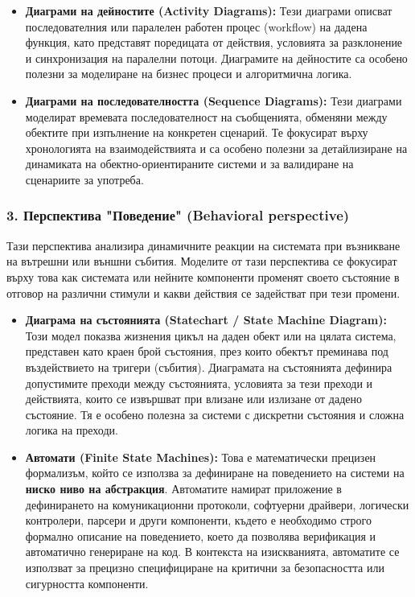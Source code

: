 \documentclass{scrartcl}
\begin{document}
\begin{FlushLeft}
\begin{itemize}
    \item \textbf{Диаграми на дейностите (Activity Diagrams):} Тези диаграми описват последователния или паралелен работен процес (workflow) на дадена функция, като представят поредицата от действия, условията за разклонение и синхронизация на паралелни потоци. Диаграмите на дейностите са особено полезни за моделиране на бизнес процеси и алгоритмична логика.
    
    \item \textbf{Диаграми на последователността (Sequence Diagrams):} Тези диаграми моделират времевата последователност на съобщенията, обменяни между обектите при изпълнение на конкретен сценарий. Те фокусират върху хронологията на взаимодействията и са особено полезни за детайлизиране на динамиката на обектно-ориентираните системи и за валидиране на сценариите за употреба.
\end{itemize}

\subsubsection{3. Перспектива "Поведение" (Behavioral perspective)}

Тази перспектива анализира динамичните реакции на системата при възникване на вътрешни или външни събития. Моделите от тази перспектива се фокусират върху това как системата или нейните компоненти променят своето състояние в отговор на различни стимули и какви действия се задействат при тези промени.

\begin{itemize}
    \item \textbf{Диаграма на състоянията (Statechart / State Machine Diagram):} Този модел показва жизнения цикъл на даден обект или на цялата система, представен като краен брой състояния, през които обектът преминава под въздействието на тригери (събития). Диаграмата на състоянията дефинира допустимите преходи между състоянията, условията за тези преходи и действията, които се извършват при влизане или излизане от дадено състояние. Тя е особено полезна за системи с дискретни състояния и сложна логика на преходи.
    
    \item \textbf{Автомати (Finite State Machines):} Това е математически прецизен формализъм, който се използва за дефиниране на поведението на системи на \textbf{ниско ниво на абстракция}. Автоматите намират приложение в дефинирането на комуникационни протоколи, софтуерни драйвери, логически контролери, парсери и други компоненти, където е необходимо строго формално описание на поведението, което да позволява верификация и автоматично генериране на код. В контекста на изискванията, автоматите се използват за прецизно специфициране на критични за безопасността или сигурността компоненти.
\end{itemize}

\end{FlushLeft}
\end{document}
